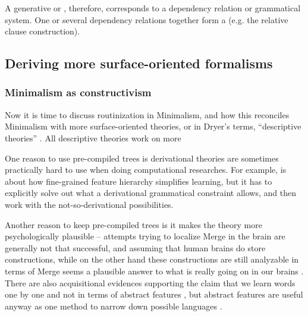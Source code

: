 \documentclass[../main.tex]{subfiles}
\begin{document}

A generative  or , 
therefore, corresponds to a dependency relation or grammatical system.
One or several dependency relations together form a 
(e.g. the relative clause construction).

\subsection{Deriving more surface-oriented formalisms}

\subsubsection{Minimalism as constructivism}\label{sec:routine}

Now it is time to discuss routinization in Minimalism, 
and how this reconciles Minimalism with more surface-oriented theories, 
or in Dryer's terms, ``descriptive theories'' \citep{dryer2006descriptive}.
All descriptive theories work on more %

One reason to use pre-compiled trees is derivational theories are sometimes 
practically hard to use when doing computational researches. For example, \citet{liter2020modeling}
is about how fine-grained feature hierarchy simplifies learning, but it has to explicitly solve out what 
a derivational grammatical constraint allows, and then work with the not-so-derivational possibilities.

Another reason to keep pre-compiled trees is it makes the theory more psychologically plausible --
attempts trying to localize Merge in the brain are generally not that successful, and assuming that 
human brains do store constructions, while on the other hand these constructions are still analyzable 
in terms of Merge seems a plausible answer to what is really going on in our brains
\citep{brain-syntax-1,brain-syntax-2}. There are also acquisitional evidences supporting the claim 
that we learn words one by one and not in terms of abstract features \citep{white2022lexicalization},
but abstract features are useful anyway as one method to narrow down possible languages \citep{liter2020modeling}.
\end{document}
